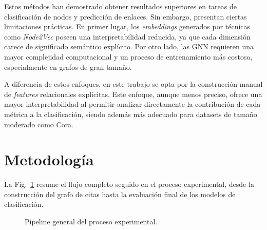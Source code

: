 \documentclass[conference,a4paper]{IEEEtran}
\def\figurename{Fig.}
\begin{document}
Estos métodos han demostrado obtener resultados superiores en tareas de clasificación de nodos y 
predicción de enlaces. Sin embargo, presentan ciertas limitaciones prácticas. En primer lugar, los 
\emph{embeddings} generados por técnicas como \emph{Node2Vec} poseen una interpretabilidad reducida, ya que cada dimensión 
carece de significado semántico explícito. Por otro lado, las GNN requieren una mayor complejidad computacional 
y un proceso de entrenamiento más costoso, especialmente en grafos de gran tamaño.

A diferencia de estos enfoques, en este trabajo se opta por la 
construcción manual de \emph{features} relacionales explícitas. Este enfoque, 
aunque menos preciso, ofrece una mayor interpretabilidad 
al permitir analizar directamente la contribución de cada métrica 
a la clasificación, siendo además más adecuado para datasets de 
tamaño moderado como Cora.

\section{Metodología}
\label{sec:metodologia}

La \figurename~\ref{fig:pipeline} resume el flujo completo seguido en el proceso experimental, 
desde la construcción del grafo de citas hasta la evaluación final de los modelos de clasificación.


\begin{figure}[htbp]
\centering


\caption{Pipeline general del proceso experimental.}
\label{fig:pipeline}
\end{figure}
\end{document}

